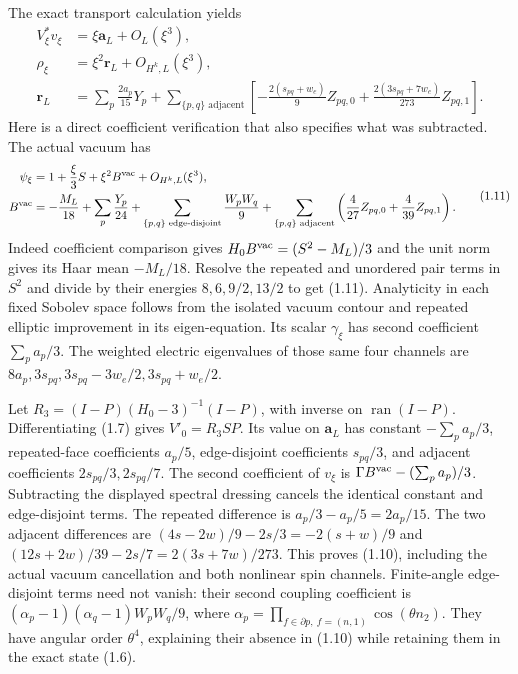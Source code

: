 \documentclass[
  11pt,
]{article}
\begin{document}
The exact transport calculation yields \[
\begin{split}
 V_\xi^*v_\xi&=\xi\mathbf a_L+O_L(\xi^3),\\
 \rho_\xi&=\xi^2\mathbf r_L+O_{H^k,L}(\xi^3),\\
 \mathbf r_L&=\sum_p\frac{2a_p}{15}Y_p
 +\sum_{\{p,q\}\text{ adjacent}}
 \left[-\frac{2(s_{pq}+w_e)}9Z_{pq,0}
       +\frac{2(3s_{pq}+7w_e)}{273}Z_{pq,1}\right].
\end{split}
\tag{1.10}
\] Here is a direct coefficient verification that also specifies what
was subtracted. The actual vacuum has \[
\begin{split}
 \psi_\xi&=1+\frac\xi3S+\xi^2B^{\rm vac}+O_{H^k,L}(\xi^3),\\
 B^{\rm vac}&=-\frac{M_L}{18}+\sum_p\frac{Y_p}{24}
 +\sum_{\{p,q\}\text{ edge-disjoint}}\frac{W_pW_q}{9}
 +\sum_{\{p,q\}\text{ adjacent}}
     \left(\frac4{27}Z_{pq,0}+\frac4{39}Z_{pq,1}\right).
\end{split}
\tag{1.11}
\] Indeed coefficient comparison gives \(H_0B^{\rm vac}=(S^2-M_L)/3\)
and the unit norm gives its Haar mean \(-M_L/18\). Resolve the repeated
and unordered pair terms in \(S^2\) and divide by their energies
\(8,6,9/2,13/2\) to get (1.11). Analyticity in each fixed Sobolev space
follows from the isolated vacuum contour and repeated elliptic
improvement in its eigen-equation. Its scalar \(\gamma_\xi\) has second
coefficient \(\sum_pa_p/3\). The weighted electric eigenvalues of those
same four channels are \(8a_p,3s_{pq},3s_{pq}-3w_e/2,3s_{pq}+w_e/2\).

Let \(R_3=(I-P)(H_0-3)^{-1}(I-P)\), with inverse on
\(\operatorname{ran}(I-P)\). Differentiating (1.7) gives \(V'_0=R_3SP\).
Its value on \(\mathbf a_L\) has constant \(-\sum_pa_p/3\),
repeated-face coefficients \(a_p/5\), edge-disjoint coefficients
\(s_{pq}/3\), and adjacent coefficients \(2s_{pq}/3,2s_{pq}/7\). The
second coefficient of \(v_\xi\) is \(\Gamma B^{\rm vac}-(\sum_pa_p)/3\).
Subtracting the displayed spectral dressing cancels the identical
constant and edge-disjoint terms. The repeated difference is
\(a_p/3-a_p/5=2a_p/15\). The two adjacent differences are
\((4s-2w)/9-2s/3=-2(s+w)/9\) and \((12s+2w)/39-2s/7=2(3s+7w)/273\). This
proves (1.10), including the actual vacuum cancellation and both
nonlinear spin channels. Finite-angle edge-disjoint terms need not
vanish: their second coupling coefficient is
\((\alpha_p-1)(\alpha_q-1)W_pW_q/9\), where
\(\alpha_p=\prod_{f\in\partial p,\ f=(n,1)}\cos(\theta n_2)\). They have
angular order \(\theta^4\), explaining their absence in (1.10) while
retaining them in the exact state (1.6).
\end{document}
